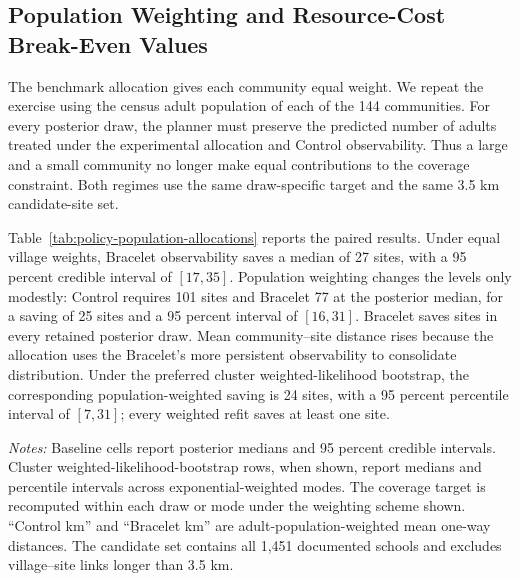 \documentclass[12pt]{article}
\begin{document}
\providecommand{\StructuralRobustnessPath}{appendix/structural-robustness}

\subsection{Population Weighting and Resource-Cost Break-Even Values}
\label{app:policy-population-cost}

The benchmark allocation gives each community equal weight. We repeat the
exercise using the census adult population of each of the 144 communities.
For every posterior draw, the planner must preserve the predicted number of
adults treated under the experimental allocation and Control observability.
Thus a large and a small community no longer make equal contributions to the
coverage constraint. Both regimes use the same draw-specific target and the
same 3.5 km candidate-site set.

Table~\ref{tab:policy-population-allocations} reports the paired results. Under
equal village weights, Bracelet observability saves a median of 27 sites, with
a 95 percent credible interval of $[17,35]$. Population weighting changes the
levels only modestly: Control requires 101 sites and Bracelet 77 at the
posterior median, for a saving of 25 sites and a 95 percent interval of
$[16,31]$. Bracelet saves sites in every retained posterior draw. Mean
community--site distance rises because the allocation uses the Bracelet's
more persistent observability to consolidate distribution.
Under the preferred cluster weighted-likelihood bootstrap, the corresponding
population-weighted saving is 24 sites, with a 95 percent percentile interval
of $[7,31]$; every weighted refit saves at least one site.

\begin{table}[htbp]
  \centering
  \scriptsize
  \caption{Population weighting in the policy allocation}
  \label{tab:policy-population-allocations}
  \resizebox{\textwidth}{!}{%
  }
  \begin{minipage}{0.96\linewidth}
    \vspace{0.35em}\footnotesize
    \textit{Notes:} Baseline cells report posterior medians and 95 percent
    credible intervals. Cluster weighted-likelihood-bootstrap rows, when
    shown, report medians and percentile intervals across exponential-weighted
    modes. The coverage target is recomputed within each draw or mode under
    the weighting scheme shown. ``Control km'' and
    ``Bracelet km'' are adult-population-weighted mean one-way distances.
    The candidate set contains all 1,451 documented schools and excludes
    village--site links longer than 3.5 km.
  \end{minipage}
\end{table}
\end{document}
